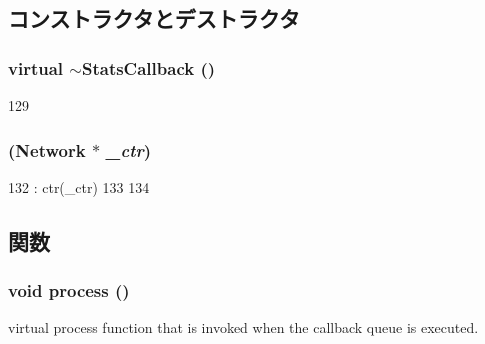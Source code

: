 \subsection{コンストラクタとデストラクタ}
\hypertarget{classNetwork_1_1StatsCallback_af912e043410ed023ceb7b6eacf42a794}{
\subsubsection[{$\sim$StatsCallback}]{\setlength{\rightskip}{0pt plus 5cm}virtual $\sim${\bf StatsCallback} ()}}
\label{classNetwork_1_1StatsCallback_af912e043410ed023ceb7b6eacf42a794}



\begin{DoxyCode}
129 {}
\end{DoxyCode}
\hypertarget{classNetwork_1_1StatsCallback_a954f1218381a4e8c333dc55cecebff73}{
\subsubsection[{StatsCallback}]{ ({\bf Network} $\ast$ {\em \_\-ctr})}}
\label{classNetwork_1_1StatsCallback_a954f1218381a4e8c333dc55cecebff73}



\begin{DoxyCode}
132             : ctr(_ctr)
133         {
134         }
\end{DoxyCode}


\subsection{関数}
\hypertarget{classNetwork_1_1StatsCallback_a2e9c5136d19b1a95fc427e0852deab5c}{
\subsubsection[{process}]{\setlength{\rightskip}{0pt plus 5cm}void process ()}}
\label{classNetwork_1_1StatsCallback_a2e9c5136d19b1a95fc427e0852deab5c}
virtual process function that is invoked when the callback queue is executed. 

